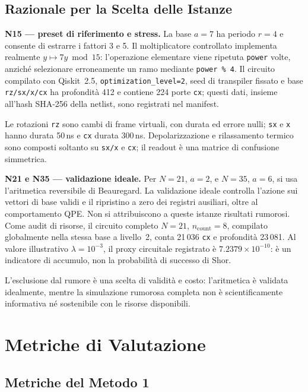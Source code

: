 \begin{onehalfspace}
\subsection{Razionale per la Scelta delle Istanze}
\label{subsec:razionale_istanze}

\textbf{N15 --- preset di riferimento e stress.}
La base $a=7$ ha periodo $r=4$ e consente di estrarre i fattori 3 e 5. Il moltiplicatore controllato implementa realmente $y\mapsto 7y\bmod15$: l'operazione elementare viene ripetuta \texttt{power} volte, anziché selezionare erroneamente un ramo mediante \texttt{power \% 4}. Il circuito compilato con Qiskit~2.5, \texttt{optimization\_level=2}, seed di transpiler fissato e base \texttt{rz/sx/x/cx} ha profondità 412 e contiene 224 porte \texttt{cx}; questi dati, insieme all'hash SHA-256 della netlist, sono registrati nel manifest.

Le rotazioni \texttt{rz} sono cambi di frame virtuali, con durata ed errore nulli; \texttt{sx} e \texttt{x} hanno durata 50\,ns e \texttt{cx} durata 300\,ns. Depolarizzazione e rilassamento termico sono composti soltanto su \texttt{sx/x} e \texttt{cx}; il readout è una matrice di confusione simmetrica.

\textbf{N21 e N35 --- validazione ideale.}
Per $N=21$, $a=2$, e $N=35$, $a=6$, si usa l'aritmetica reversibile di Beauregard. La validazione ideale controlla l'azione sui vettori di base validi e il ripristino a zero dei registri ausiliari, oltre al comportamento QPE. Non si attribuiscono a queste istanze risultati rumorosi. Come audit di risorse, il circuito completo $N=21$, $n_{\text{count}}=8$, compilato globalmente nella stessa base a livello~2, conta 21\,036 \texttt{cx} e profondità 23\,081. Al valore illustrativo $\lambda=10^{-3}$, il proxy circuitale registrato è $7.2379\times10^{-10}$: è un indicatore di accumulo, non la probabilità di successo di Shor.

L'esclusione dal rumore è una scelta di validità e costo: l'aritmetica è validata idealmente, mentre la simulazione rumorosa completa non è scientificamente informativa né sostenibile con le risorse disponibili.

\section{Metriche di Valutazione}
\label{sec:metriche}

\subsection{Metriche del Metodo 1}


\end{onehalfspace}
